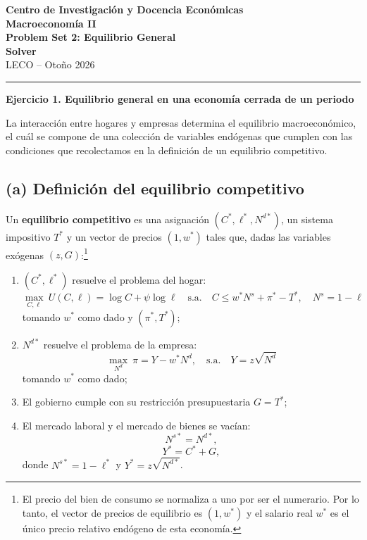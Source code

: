 \documentclass[11pt]{article}
\begin{document}
\begin{center}
  {\large\textbf{Centro de Investigación y Docencia Económicas}}\\[0.25em]
  {\large\textbf{Macroeconomía II}}\\[0.2em]
  {\large\textbf{Problem Set 2: Equilibrio General}}\\[0.2em]
  {\large\textbf{Solver}}\\[0.35em]
  LECO -- Otoño 2026
\end{center}

\vspace{0.6em}
\hrule
\vspace{0.8em}

\noindent\textbf{Ejercicio 1. Equilibrio general en una economía cerrada de un periodo}

La interacción entre hogares y empresas determina el equilibrio macroeconómico, el cuál se compone de una colección de variables endógenas que cumplen con las condiciones que recolectamos en la definición de un equilibrio competitivo.

\subsection*{(a) Definición del equilibrio competitivo}

Un \textbf{equilibrio competitivo} es una asignación
$
  \left(C^*,\ell^*, N^{d*}\right)
$, un sistema impositivo $T^*$ y un vector de precios $(1,w^*)$ tales que, dadas las variables exógenas $(z,G)$:\footnote{El precio del bien de consumo se normaliza a uno por ser el numerario. Por lo tanto, el vector de precios de equilibrio es $(1,w^*)$ y el salario real $w^*$ es el único precio relativo endógeno de esta economía.}
\begin{enumerate}
  \item $(C^*,\ell^*)$ resuelve el problema del hogar:
  \[
    \max_{C,\ell}
    \ U(C,\ell) = \log C+\psi\log\ell
    \quad 
    \text{s.a.}
    \quad 
    C\leq w^*N^s+\pi^*-T^*, 
    \quad N^s = 1 - \ell
  \]
  tomando $w^*$ como dado y $(\pi^*, T^*)$;

  \item $N^{d*}$ resuelve el problema de la empresa:
  \[
    \max_{N^d}
    \ \pi = Y-w^*N^d, 
        \quad 
    \text{s.a.}
    \quad 
    Y = z\sqrt{N^d}
  \]
  tomando $w^*$ como dado;
  \item El gobierno cumple con su restricción presupuestaria $G = T^*$;
  \item El mercado laboral y el mercado de bienes se vacían:
  \[
    N^{s*} = N^{d*},
  \]
  \[
    Y^*=C^*+G,
  \]
  donde $N^{s*}=1-\ell^*$ y $Y^* = z\sqrt{N^{d*}}$.
\end{enumerate}
\end{document}
